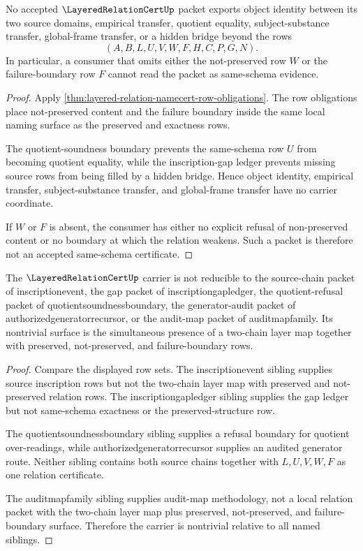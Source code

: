 \begin{theorem}
\label{thm:layered-relation-namecert-row-refusal}
No accepted $\LayeredRelationCertUp$ packet exports object identity between its two source domains, empirical transfer, quotient equality, subject-substance transfer, global-frame transfer, or a hidden bridge beyond the rows
$$
(A,B,L,U,V,W,F,H,C,P,G,N).
$$
In particular, a consumer that omits either the not-preserved row $W$ or the failure-boundary row $F$ cannot read the packet as same-schema evidence.
\end{theorem}
\begin{proof}
Apply \autoref{thm:layered-relation-namecert-row-obligations}. The row obligations place not-preserved content and the failure boundary inside the same local naming surface as the preserved and exactness rows.

The quotient-soundness boundary prevents the same-schema row $U$ from becoming quotient equality, while the inscription-gap ledger prevents missing source rows from being filled by a hidden bridge. Hence object identity, empirical transfer, subject-substance transfer, and global-frame transfer have no carrier coordinate.

If $W$ or $F$ is absent, the consumer has either no explicit refusal of non-preserved content or no boundary at which the relation weakens. Such a packet is therefore not an accepted same-schema certificate.
\end{proof}

\begin{theorem}
\label{thm:layered-relation-namecert-row-nontriviality}
The $\LayeredRelationCertUp$ carrier is not reducible to the source-chain packet of inscriptionevent, the gap packet of inscriptiongapledger, the quotient-refusal packet of quotientsoundnessboundary, the generator-audit packet of authorizedgeneratorrecursor, or the audit-map packet of auditmapfamily. Its nontrivial surface is the simultaneous presence of a two-chain layer map together with preserved, not-preserved, and failure-boundary rows.
\end{theorem}
\begin{proof}
Compare the displayed row sets. The inscriptionevent sibling supplies source inscription rows but not the two-chain layer map with preserved and not-preserved relation rows. The inscriptiongapledger sibling supplies the gap ledger but not same-schema exactness or the preserved-structure row.

The quotientsoundnessboundary sibling supplies a refusal boundary for quotient over-readings, while authorizedgeneratorrecursor supplies an audited generator route. Neither sibling contains both source chains together with $L,U,V,W,F$ as one relation certificate.

The auditmapfamily sibling supplies audit-map methodology, not a local relation packet with the two-chain layer map plus preserved, not-preserved, and failure-boundary surface. Therefore the carrier is nontrivial relative to all named siblings.
\end{proof}

